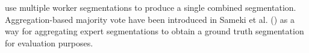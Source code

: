  use multiple worker segmentations to produce a single combined segmentation. %
Aggregation-based majority vote have been introduced in Sameki et al. (\citeyear{Sameki2015}) as a way for aggregating expert segmentations to obtain a ground truth segmentation for evaluation purposes. 